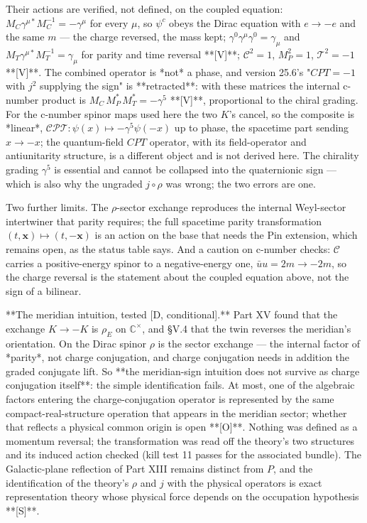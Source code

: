 Their actions are verified, not defined, on the coupled equation: $M_C\gamma^{\mu*}M_C^{-1} = -\gamma^\mu$ for every $\mu$, so $\psi^c$ obeys the Dirac equation with $e\to-e$ and the same $m$ — the charge reversed, the mass kept; $\gamma^0\gamma^\mu\gamma^0 = \gamma_\mu$ and $M_T\gamma^{\mu*}M_T^{-1} = \gamma_\mu$ for parity and time reversal **[V]**; $\mathcal C^2 = 1$, $M_P^2 = 1$, $\mathcal T^2 = -1$ **[V]**. The combined operator is *not* a phase, and version 25.6's "$CPT = -1$ with $j^2$ supplying the sign" is **retracted**: with these matrices the internal c-number product is $M_C\,M_P^*\,M_T^* = -\gamma^5$ **[V]**, proportional to the chiral grading. For the c-number spinor maps used here the two $K$'s cancel, so the composite is *linear*, $\mathcal C\mathcal P\mathcal T:\psi(x)\mapsto-\gamma^5\psi(-x)$ up to phase, the spacetime part sending $x\to-x$; the quantum-field $CPT$ operator, with its field-operator and antiunitarity structure, is a different object and is not derived here. The chirality grading $\gamma^5$ is essential and cannot be collapsed into the quaternionic sign — which is also why the ungraded $j\circ\rho$ was wrong; the two errors are one.

Two further limits. The $\rho$-sector exchange reproduces the internal Weyl-sector intertwiner that parity requires; the full spacetime parity transformation $(t,\mathbf x)\mapsto(t,-\mathbf x)$ is an action on the base that needs the Pin extension, which remains open, as the status table says. And a caution on c-number checks: $\mathcal C$ carries a positive-energy spinor to a negative-energy one, $\bar uu = 2m\to-2m$, so the charge reversal is the statement about the coupled equation above, not the sign of a bilinear.

**The meridian intuition, tested [D, conditional].** Part XV found that the exchange $K\to-K$ is $\rho_E$ on $\mathbb C^\times$, and §V.4 that the twin reverses the meridian's orientation. On the Dirac spinor $\rho$ is the sector exchange — the internal factor of *parity*, not charge conjugation, and charge conjugation needs in addition the graded conjugate lift. So **the meridian-sign intuition does not survive as charge conjugation itself**: the simple identification fails. At most, one of the algebraic factors entering the charge-conjugation operator is represented by the same compact-real-structure operation that appears in the meridian sector; whether that reflects a physical common origin is open **[O]**. Nothing was defined as a momentum reversal; the transformation was read off the theory's two structures and its induced action checked (kill test 11 passes for the associated bundle). The Galactic-plane reflection of Part XIII remains distinct from $P$, and the identification of the theory's $\rho$ and $j$ with the physical operators is exact representation theory whose physical force depends on the occupation hypothesis **[S]**.

